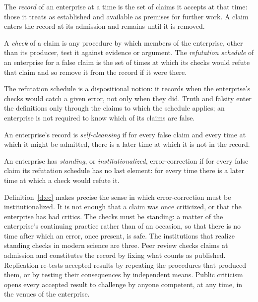 \documentclass{situationist-preprint}
\begin{document}
\begin{definition}[Record]\label{d:record}
The \emph{record} of an enterprise at a time is the set of claims it accepts at that time: those it treats as established and available as premises for further work. A claim enters the record at its admission and remains until it is removed.
\end{definition}

\begin{definition}\label{d:schedule}
A \emph{check} of a claim is any procedure by which members of the enterprise, other than its producer, test it against evidence or argument. The \emph{refutation schedule} of an enterprise for a false claim is the set of times at which its checks would refute that claim and so remove it from the record if it were there.
\end{definition}

The refutation schedule is a dispositional notion: it records when the enterprise's checks would catch a given error, not only when they did. Truth and falsity enter the definitions only through the claims to which the schedule applies; an enterprise is not required to know which of its claims are false.

\begin{definition}\label{d:clean}
An enterprise's record is \emph{self-cleansing} if for every false claim and every time at which it might be admitted, there is a later time at which it is not in the record.
\end{definition}

\begin{definition}\label{d:ec}
An enterprise has \emph{standing}, or \emph{institutionalized}, error-correction if for every false claim its refutation schedule has no last element: for every time there is a later time at which a check would refute it.
\end{definition}

Definition~\ref{d:ec} makes precise the sense in which error-correction must be institutionalized. It is not enough that a claim was once criticized, or that the enterprise has had critics. The checks must be standing: a matter of the enterprise's continuing practice rather than of an occasion, so that there is no time after which an error, once present, is safe. The institutions that realize standing checks in modern science are three. Peer review checks claims at admission and constitutes the record by fixing what counts as published. Replication re-tests accepted results by repeating the procedures that produced them, or by testing their consequences by independent means. Public criticism opens every accepted result to challenge by anyone competent, at any time, in the venues of the enterprise.
\end{document}
